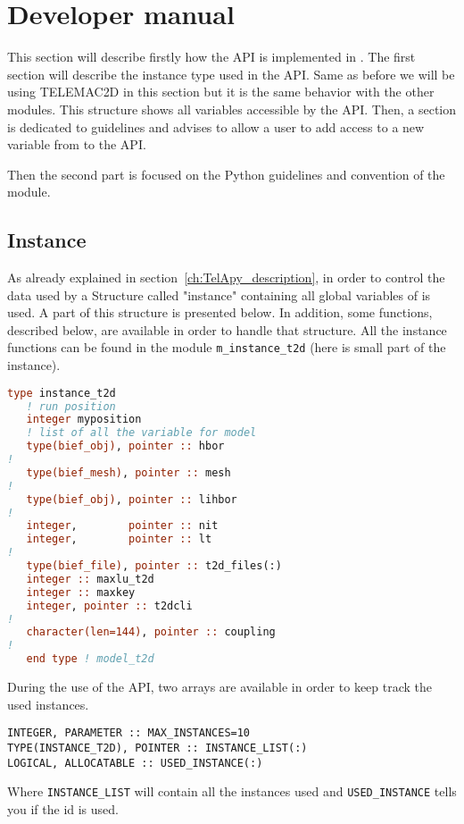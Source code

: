 \chapter{Developer manual}
\label{ch:hydrod:sim}

This section will describe firstly how the API is implemented in \fortran.  The
first section will describe the instance type used in the API\@. Same as before
we will be using TELEMAC{2D} in this section but it is the same behavior with
the other modules. This structure shows all variables accessible by the
\fortran API\@. Then, a section is dedicated to guidelines and advises to allow
a user to add access to a new variable from  to the API\@.

Then the second part is focused on the Python guidelines and convention
of the \TelApy{} module.
%
\section{Instance}
%
As already explained in section~\ref{ch:TelApy_description}, in order to
control the data used by  a \fortran Structure called "instance"
containing all global variables of  is used. A part of this
structure is presented below.  In addition, some functions, described below,
are available in order to handle that structure. All the instance functions can
be found in the \fortran module \verb!m_instance_t2d! (here is small part of
the instance).

\begin{lstlisting}[language=Fortran]
type instance_t2d
   ! run position
   integer myposition
   ! list of all the variable for model
   type(bief_obj), pointer :: hbor
!
   type(bief_mesh), pointer :: mesh
!
   type(bief_obj), pointer :: lihbor
!
   integer,        pointer :: nit
   integer,        pointer :: lt
!
   type(bief_file), pointer :: t2d_files(:)
   integer :: maxlu_t2d
   integer :: maxkey
   integer, pointer :: t2dcli
!
   character(len=144), pointer :: coupling
!
   end type ! model_t2d
\end{lstlisting}

During the use of the API, two arrays are available in order to keep track the
used instances.
\begin{lstlisting}
INTEGER, PARAMETER :: MAX_INSTANCES=10
TYPE(INSTANCE_T2D), POINTER :: INSTANCE_LIST(:)
LOGICAL, ALLOCATABLE :: USED_INSTANCE(:)
\end{lstlisting}

Where \verb!INSTANCE_LIST! will contain all the instances used and
\verb!USED_INSTANCE! tells you if the id is used.

